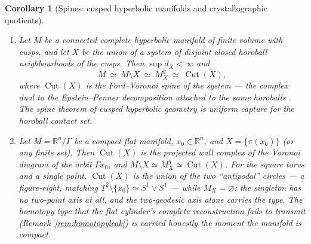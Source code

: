 \documentclass[11pt]{article}
\newtheorem{corollary}[theorem]{Corollary}
\theoremstyle{remark}
\newcommand{\R}{\mathbb{R}}
\newcommand{\X}{X}
\newcommand{\Mx}{M_{\X}}
\newcommand{\Mg}{M^{g}_{\X}}
\newcommand{\dX}{d_{\X}}
\newcommand{\Cut}{\operatorname{Cut}}
\begin{document}
\begin{corollary}[Spines: cusped hyperbolic manifolds and
crystallographic quotients]\label{cor:spines}
\begin{enumerate}[label=\textup{(\alph*)}]
\item Let $M$ be a connected complete hyperbolic manifold of
finite volume with cusps, and let $\X$ be the union of a system of
disjoint closed horoball neighbourhoods of the cusps. Then
$\sup\dX<\infty$ and
\[
  M\ \simeq\ M\setminus\X\ \simeq\ \Mg\ \simeq\ \Cut(\X) ,
\]
where $\Cut(\X)$ is the Ford--Voronoi spine of the system --- the
complex dual to the Epstein--Penner decomposition attached to the
same horoballs \cite{EP}. The spine theorem of cusped hyperbolic
geometry is uniform capture for the horoball contact set.
\item Let $M=\R^{n}/\Gamma$ be a compact flat manifold,
$x_{0}\in\R^{n}$, and $\X=\{\pi(x_{0})\}$ (or any finite set).
Then $\Cut(\X)$ is the projected wall complex of the Voronoi
diagram of the orbit $\Gamma x_{0}$, and
$M\setminus\X\simeq\Mg\simeq\Cut(\X)$. For the square torus and a
single point, $\Cut(\X)$ is the union of the two ``antipodal''
circles --- a figure-eight, matching
$T^{2}\setminus\{x_{0}\}\simeq S^{1}\vee S^{1}$ --- while
$\Mx=\varnothing$: the singleton has no two-point axis at all, and
the two-geodesic axis alone carries the type. The homotopy type
that the flat cylinder's complete reconstruction fails to transmit
(Remark~\ref{rem:homotopyleak}) is carried honestly the moment the
manifold is compact.
\end{enumerate}
\end{corollary}
\end{document}
